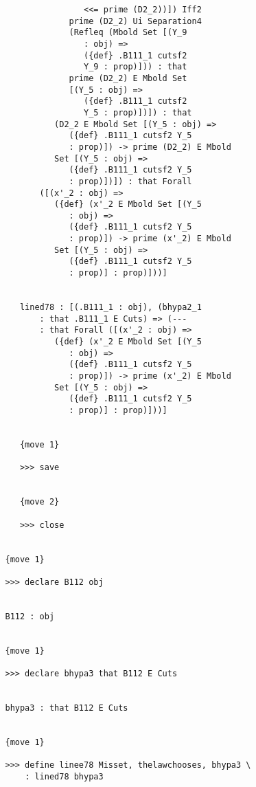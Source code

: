 \documentclass[12pt]{article}
\begin{document}
\begin{verbatim}
                   <<= prime (D2_2))]) Iff2 
                prime (D2_2) Ui Separation4 
                (Refleq (Mbold Set [(Y_9 
                   : obj) => 
                   ({def} .B111_1 cutsf2 
                   Y_9 : prop)])) : that 
                prime (D2_2) E Mbold Set 
                [(Y_5 : obj) => 
                   ({def} .B111_1 cutsf2 
                   Y_5 : prop)])]) : that 
             (D2_2 E Mbold Set [(Y_5 : obj) => 
                ({def} .B111_1 cutsf2 Y_5 
                : prop)]) -> prime (D2_2) E Mbold 
             Set [(Y_5 : obj) => 
                ({def} .B111_1 cutsf2 Y_5 
                : prop)])]) : that Forall 
          ([(x'_2 : obj) => 
             ({def} (x'_2 E Mbold Set [(Y_5 
                : obj) => 
                ({def} .B111_1 cutsf2 Y_5 
                : prop)]) -> prime (x'_2) E Mbold 
             Set [(Y_5 : obj) => 
                ({def} .B111_1 cutsf2 Y_5 
                : prop)] : prop)]))]


      lined78 : [(.B111_1 : obj), (bhypa2_1 
          : that .B111_1 E Cuts) => (--- 
          : that Forall ([(x'_2 : obj) => 
             ({def} (x'_2 E Mbold Set [(Y_5 
                : obj) => 
                ({def} .B111_1 cutsf2 Y_5 
                : prop)]) -> prime (x'_2) E Mbold 
             Set [(Y_5 : obj) => 
                ({def} .B111_1 cutsf2 Y_5 
                : prop)] : prop)]))]


      {move 1}

      >>> save


      {move 2}

      >>> close


   {move 1}

   >>> declare B112 obj


   B112 : obj


   {move 1}

   >>> declare bhypa3 that B112 E Cuts


   bhypa3 : that B112 E Cuts


   {move 1}

   >>> define linee78 Misset, thelawchooses, bhypa3 \
       : lined78 bhypa3



\end{verbatim}
\end{document}

